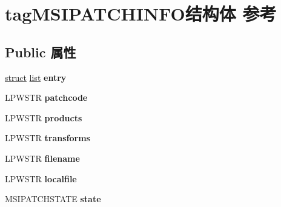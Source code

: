 \hypertarget{structtag_m_s_i_p_a_t_c_h_i_n_f_o}{}\section{tag\+M\+S\+I\+P\+A\+T\+C\+H\+I\+N\+F\+O结构体 参考}
\label{structtag_m_s_i_p_a_t_c_h_i_n_f_o}
\subsection*{Public 属性}
\begin{DoxyCompactItemize}
\item 
\mbox{\label{structtag_m_s_i_p_a_t_c_h_i_n_f_o_a9dedb79bcef750ecea0af5841132307f}} 
\hyperlink{interfacestruct}{struct} \hyperlink{classlist}{list} {\bfseries entry}
\item 
\mbox{\label{structtag_m_s_i_p_a_t_c_h_i_n_f_o_a8bf75c8b5f7bd27eb9aa3b39167a34e3}} 
L\+P\+W\+S\+TR {\bfseries patchcode}
\item 
\mbox{\label{structtag_m_s_i_p_a_t_c_h_i_n_f_o_acbbdeade9179dc274218e9ef5db62766}} 
L\+P\+W\+S\+TR {\bfseries products}
\item 
\mbox{\label{structtag_m_s_i_p_a_t_c_h_i_n_f_o_a9bc72dde2adad4c0f635fb638a0cff74}} 
L\+P\+W\+S\+TR {\bfseries transforms}
\item 
\mbox{\label{structtag_m_s_i_p_a_t_c_h_i_n_f_o_acf39b3b867c17c6e335b0bf31fd31e5b}} 
L\+P\+W\+S\+TR {\bfseries filename}
\item 
\mbox{\label{structtag_m_s_i_p_a_t_c_h_i_n_f_o_ab9a68ed2b5231b7a3c473e9a9e88f618}} 
L\+P\+W\+S\+TR {\bfseries localfile}
\item 
\mbox{\label{structtag_m_s_i_p_a_t_c_h_i_n_f_o_ab0ff09a349c17afd0d26cc27542cd04c}} 
M\+S\+I\+P\+A\+T\+C\+H\+S\+T\+A\+TE {\bfseries state}
\item 
\mbox{\label{structtag_m_s_i_p_a_t_c_h_i_n_f_o_a8262ec8d822e0a19b33974628b638b63}} 

\end{DoxyCompactItemize}
